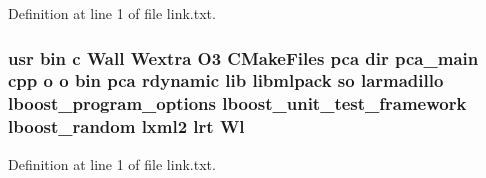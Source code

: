 Definition at line 1 of file link.\-txt.

\subsubsection[{Wl}]{\setlength{\rightskip}{0pt plus 5cm}usr bin c Wall Wextra O3 C\-Make\-Files pca dir pca\-\_\-main cpp o o bin pca rdynamic lib libmlpack so larmadillo lboost\-\_\-program\-\_\-options lboost\-\_\-unit\-\_\-test\-\_\-framework lboost\-\_\-random lxml2 lrt Wl}\label{methods_2pca_2CMakeFiles_2pca_8dir_2link_8txt_a20e75fcb86e3284553263dc03e152895}


Definition at line 1 of file link.\-txt.

